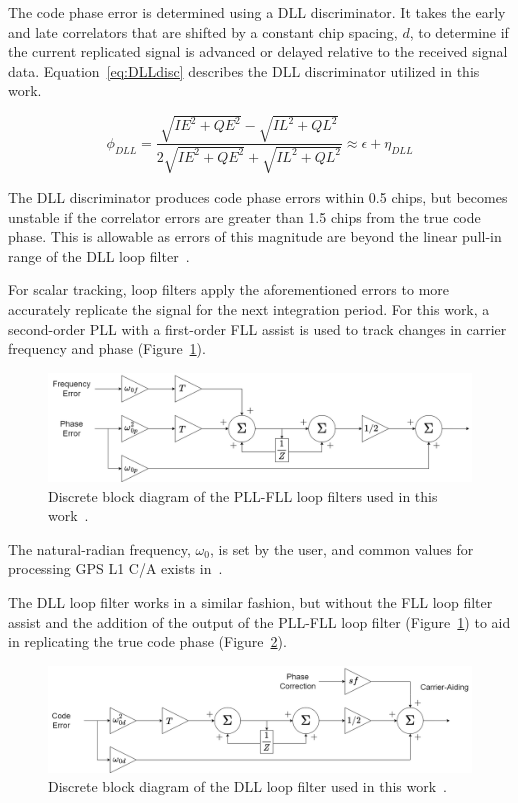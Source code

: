 The code phase error is determined using a DLL discriminator. It takes the early and late correlators that are shifted by a constant chip spacing, \(d\), to determine if the current replicated signal is advanced or delayed relative to the received signal data. Equation~\ref{eq:DLLdisc} describes the DLL discriminator utilized in this work.

\begin{equation}\label{eq:DLLdisc}
    \phi_{DLL} = \frac{\sqrt{IE^2 + QE^2} - \sqrt{IL^2 + QL^2}}{2 \sqrt{IE^2 + QE^2} + \sqrt{IL^2 + QL^2}} \approx \epsilon + \eta_{DLL}
\end{equation}

The DLL discriminator produces code phase errors within 0.5 chips, but becomes unstable if the correlator errors are greater than 1.5 chips from the true code phase. This is allowable as errors of this magnitude are beyond the linear pull-in range of the DLL loop filter~\cite{kaplanUnderstandingGPSPrinciples2006}.

For scalar tracking, loop filters apply the aforementioned errors to more accurately replicate the signal for the next integration period. For this work, a second-order PLL with a first-order FLL assist is used to track changes in carrier frequency and phase (Figure~\ref{fig:PLL}).

\begin{figure}[!ht]
    \centering
    \includegraphics[width=\linewidth]{Figures/PLL.png}
    \caption{Discrete block diagram of the PLL-FLL loop filters used in this work~\cite{kaplanUnderstandingGPSPrinciples2006}.}\label{fig:PLL}
\end{figure}

The natural-radian frequency, \(\omega_0\), is set by the user, and common values for processing GPS L1 C/A exists in~\cite{kaplanUnderstandingGPSPrinciples2006}.

The DLL loop filter works in a similar fashion, but without the FLL loop filter assist and the addition of the output of the PLL-FLL loop filter (Figure~\ref{fig:PLL}) to aid in replicating the true code phase (Figure~\ref{fig:DLL}).

\begin{figure}[!ht]
    \centering
    \includegraphics[width=\linewidth]{Figures/DLL.png}
    \caption{Discrete block diagram of the DLL loop filter used in this work~\cite{kaplanUnderstandingGPSPrinciples2006}.}\label{fig:DLL}
\end{figure}

